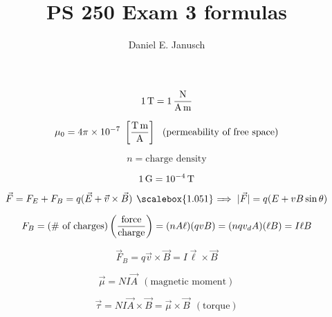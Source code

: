 \documentclass[12pt]{article}
\newcommand \hpx [1]{\hspace{#1px}}
\newcommand \nhpx [1]{\hspace{-#1px}}
\renewcommand \implies {\ensuremath{\hpx 4 \raisebox{-0.14px}{\scalebox{1.051} =} \nhpx{5.2} \Rightarrow \hpx 3}}
\begin{document}

\title{PS 250 Exam 3 formulas}
\author{Daniel E. Janusch}
\maketitle


\begin{equation}
	1\,{\rm T} = 1\,\dfrac{\rm N}{\rm A\,m}
\end{equation}

\begin{equation}
	\mu_0 = 4\pi \times 10^{-7} ~ \left[\dfrac{\rm T\,m}{\rm A}\right] ~~ (\text{permeability of free space})
\end{equation}

\begin{equation}
	n = \text{charge density}
\end{equation}

\begin{equation}
	1\,{\rm G} = 10^{-4}\,{\rm T}
\end{equation}

\begin{equation}
	\vec F = F_E + F_B = q (\vec E + \vec v \times \vec B) \implies |\vec F| = q (E + v B \sin \theta)
\end{equation}

\noindent {}

\begin{equation}
	F_B = (\text{\# of charges}) \left(\dfrac{\rm force}{\rm charge}\right)
		= (n A \ell)(q v B)
		= (n q v_d A) (\ell B)
		= I \ell B
\end{equation}

\begin{equation}
	\vec F_B = q \vec v \times \vec B = I \vec \ell \times \vec B
\end{equation}

\begin{equation}
	\vec \mu = N I \vec A ~~ (\text{magnetic moment})
\end{equation}

\begin{equation}
	\vec \tau = N I \vec A \times \vec B = \vec \mu \times \vec B ~~ (\text{torque})
\end{equation}
\end{document}
